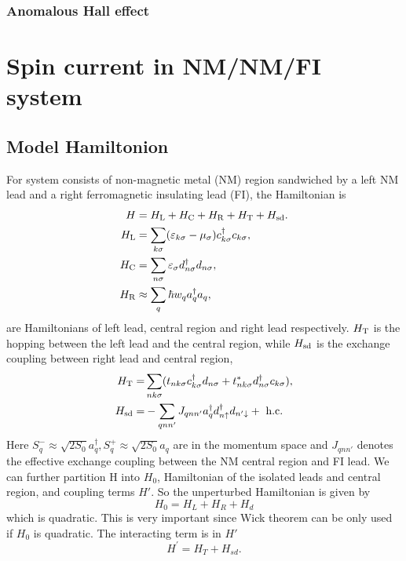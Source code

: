\documentclass[aps,prb,superscriptaddress]{revtex4-2}
\begin{document}
\subsubsection{Anomalous Hall effect}

\section{Spin current in NM/NM/FI system}
\subsection{Model Hamiltonion}
For system consists of non-magnetic metal (NM) region sandwiched by a left NM lead and a right ferromagnetic insulating lead (FI), the Hamiltonian is
\begin{align}
H&=H_{\rm L}+H_{\rm C}+H_{\rm R}+H_{\rm T}+H_{\rm sd}.\\
H_{\rm{L}} &= \sum_{k\sigma} (\varepsilon_{k\sigma}-\mu_{\sigma}) c_{k \sigma}^{\dagger} c_{k \sigma},\\
H_{\rm{C}} &= \sum_{n\sigma}\varepsilon_{\sigma} d_{n\sigma}^{\dagger} d_{n\sigma},\\
H_{\rm{R}} &\approx \sum_{q} \hbar w_{q} a_{q}^{\dagger} a_{q},
\end{align}
are Hamiltonians of left lead, central region and right lead respectively. $H_{\rm T}$ is the hopping between the left lead and the central region, while $H_{\rm sd}$ is the exchange coupling between right lead and central region,
\begin{align}
H_{\rm{T}} =& \sum_{nk\sigma}( t_{nk\sigma} c_{k \sigma}^{\dagger} d_{n\sigma} + t_{nk\sigma}^{*} d_{n\sigma}^{\dagger} c_{k\sigma}),\\
H_{\rm{sd}}=& -\sum_{q n n^{\prime}} J_{q n n^{\prime}} a_q^{\dagger} d_{n \uparrow}^{\dag} d_{n^{\prime} \downarrow} +\text { h.c. }
\end{align}
Here $S_{q}^{-} \approx \sqrt{2 S_{0}} a_{q}^{\dagger}, S_{q}^{+} \approx \sqrt{2 S_{0}} a_{q}$ are in the momentum space and $J_{qnn'}$ denotes the effective exchange coupling between the NM central region and FI lead. We can further partition H into $H_{0}$, Hamiltonian of the isolated leads and central region, and coupling terms $H'$. So the unperturbed Hamiltonian is given by
\begin{equation}
H_0=H_L+H_R+H_d
\end{equation}
which is quadratic. This is very important since Wick theorem can be only used if $H_0$ is quadratic. The interacting term is in $H'$
\begin{equation}
H^{\prime}=H_T+H_{s d}.
\end{equation}
\end{document}
